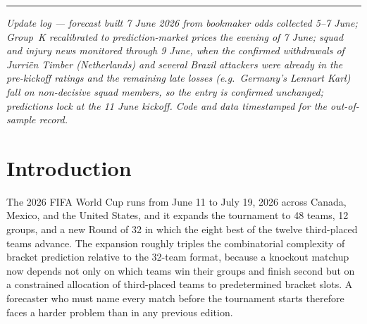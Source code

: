 \documentclass[11pt,letterpaper]{article}
\begin{document}
\begin{center}
\rule{0.6\textwidth}{0.4pt}
\end{center}

\begin{center}
\footnotesize\itshape
Update log --- forecast built 7 June 2026 from bookmaker odds collected 5--7 June;
Group~K recalibrated to prediction-market prices the evening of 7 June;
squad and injury news monitored through 9 June, when the confirmed withdrawals of Jurri\"en Timber (Netherlands) and several Brazil attackers were already in the pre-kickoff ratings and the remaining late losses (e.g.\ Germany's Lennart Karl) fall on non-decisive squad members, so the entry is confirmed unchanged;
predictions lock at the 11 June kickoff. Code and data timestamped for the out-of-sample record.
\end{center}

\section{Introduction}

The 2026 FIFA World Cup runs from June 11 to July 19, 2026 across Canada, Mexico, and the United States, and it expands the tournament to 48 teams, 12 groups, and a new Round of 32 in which the eight best of the twelve third-placed teams advance. The expansion roughly triples the combinatorial complexity of bracket prediction relative to the 32-team format, because a knockout matchup now depends not only on which teams win their groups and finish second but on a constrained allocation of third-placed teams to predetermined bracket slots. A forecaster who must name every match before the tournament starts therefore faces a harder problem than in any previous edition.
\end{document}
